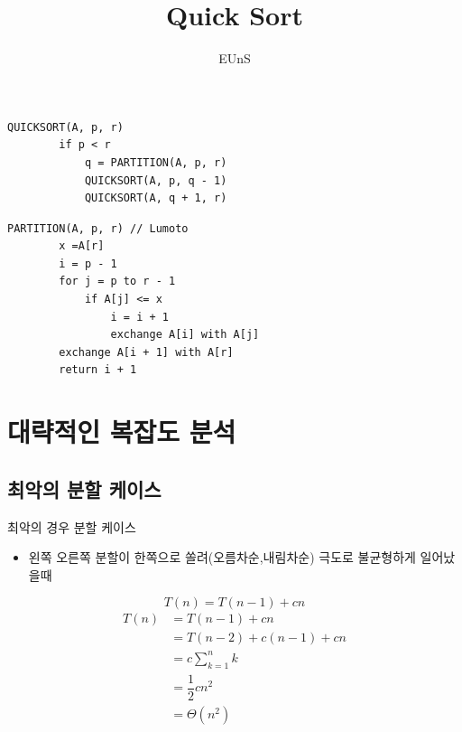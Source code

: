 \documentclass[10pt]{beamer}
\title{Quick Sort}
\author{EUnS}
\begin{document}
\begin{frame}{}
    \maketitle
\end{frame}    



\begin{frame}[fragile]{}
    \begin{lstlisting}[style = Cstyle]
    QUICKSORT(A, p, r)
        if p < r
            q = PARTITION(A, p, r)
            QUICKSORT(A, p, q - 1)
            QUICKSORT(A, q + 1, r)
    \end{lstlisting}
    \pause
    \begin{lstlisting}[style = Cstyle]
    PARTITION(A, p, r) // Lumoto
        x =A[r]
        i = p - 1
        for j = p to r - 1
            if A[j] <= x
                i = i + 1
                exchange A[i] with A[j]
        exchange A[i + 1] with A[r]
        return i + 1
    \end{lstlisting}
\end{frame}    


\section{대략적인 복잡도 분석}

\subsection{최악의 분할 케이스} 

\begin{frame}{최악의 경우 분할 케이스}
    \pause
    \begin{itemize}
        \item 왼쪽 오른쪽 분할이 한쪽으로 쏠려(오름차순,내림차순) 극도로 불균형하게 일어났을때
        \pause
    \end{itemize}
    $$T(n) = T(n-1) + cn $$
    \pause
    \begin{align*}
        T(n) &= T(n-1) + cn \\
        &= T(n-2) + c(n-1) +cn \\
        &= c\sum^{n}_{k=1}k \\
        &= \dfrac{1}{2} cn^{2}\\
        &= \Theta (n^{2})    
    \end{align*}
\end{frame}
\end{document}
